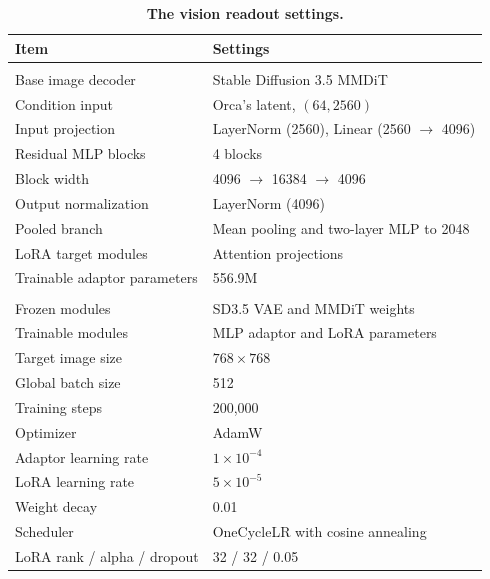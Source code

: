 \documentclass{llmxive}
\providecommand{\arraystretch}{1.12}
\begin{document}
\begin{table}[!htbp] 
\centering 
 
\begin{tabular}{ll} 
\toprule[1pt]
\textbf{Item} & \textbf{Settings} \\ 
\midrule
\rowcolor[rgb]{ .949, .949, .949} \multicolumn{2}{l}{\textit{Architecture}} \\
Base image decoder & Stable Diffusion 3.5 MMDiT \\ 
Condition input & Orca's latent, \((64, 2560)\) \\ 
Input projection & LayerNorm (2560), Linear (2560 \(\rightarrow\) 4096) \\
Residual MLP blocks & 4 blocks \\ 
Block width & 4096 \(\rightarrow\) 16384 \(\rightarrow\) 4096 \\ 
Output normalization & LayerNorm (4096) \\ 
Pooled branch & Mean pooling and two-layer MLP to 2048 \\ 
LoRA target modules & Attention projections \\ 
Trainable adaptor parameters & 556.9M \\ 
\midrule \rowcolor[rgb]{ .949, .949, .949} \multicolumn{2}{l}{\textit{Training}} \\ 
Frozen modules & SD3.5 VAE and MMDiT weights \\ 
Trainable modules & MLP adaptor and LoRA parameters \\ 
Target image size & \(768 \times 768\) \\ 
Global batch size & 512 \\ 
Training steps & 200,000 \\ 
Optimizer & AdamW \\ 
Adaptor learning rate & \(1 \times 10^{-4}\) \\ 
LoRA learning rate & \(5 \times 10^{-5}\) \\ 
Weight decay & 0.01 \\ 
Scheduler & OneCycleLR with cosine annealing \\ 
LoRA rank / alpha / dropout & 32 / 32 / 0.05 \\ 
\bottomrule[1pt] 
\end{tabular} 
\caption{\textbf{The vision readout settings.}}
\label{tab:appendix_vision_readout_settings}
\end{table}
\end{document}
